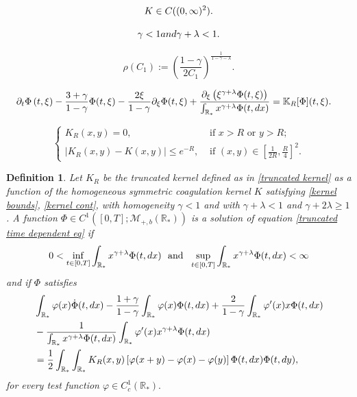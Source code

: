 \documentclass[10pt,a4paper]{amsart}
\newtheorem{definition}{Definition}
\newcommand{\der}{\textup{d}}
\begin{document}
\begin{equation}\label{kernel cont}
    K\in\textup{C}((0,\infty)^{2}).
\end{equation}

\begin{equation}\label{avoid_gelation_parameters}
    \gamma<1 \textup{ and } \gamma+\lambda<1.
\end{equation}

\begin{equation}\label{delta1formula}
\rho(C_1):= \left(\frac{1-\gamma }{2 C_1} \right)^{\frac{1}{1-\gamma -\lambda}}.
\end{equation} 

\begin{align}
\label{truncated time dependent eq}
&\partial_{t} \Phi \left( t, \xi \right)- \frac{3+\gamma}{1-\gamma}\Phi(t, \xi) - \frac{2\xi}{1-\gamma} \partial_\xi \Phi(t, \xi) + \frac{\partial_\xi \left( \xi^{\gamma+\lambda} \Phi(t, \xi)\right)  }{\int_{\mathbb R_*} x^{\gamma+\lambda} \Phi(t, \der x ) } =\mathbb K_R [\Phi](t, \xi).
\end{align}

 \begin{equation}\label{truncated kernel} 
 \begin{cases}
 K_R(x,y)=0, &\text{ if } x>R \text{ or } y > R; \\
  | K_R(x,y) - K(x,y) |\leq e^{-R}, &\text{ if } (x,y) \in \left[ \frac{1}{2 R}, \frac{R}{4}\right]^2.
 \end{cases} 
 \end{equation} 

\begin{definition}\label{def:truncated time dep} 
Let $K_R$ be the truncated kernel defined as in \eqref{truncated kernel} as a function of the homogeneous symmetric coagulation kernel $K$ satisfying
\eqref{kernel bounds}, \eqref{kernel cont},  with homogeneity $\gamma < 1 $ and with $\gamma + \lambda < 1$ and $\gamma + 2 \lambda \geq 1 $. A function $\Phi \in C^1([0,T]; \mathcal M_{+,b}(\mathbb R_*))$ is a solution of equation \eqref{truncated time dependent eq} if 
\[
0 < \inf_{  t \in [0, T]  }\int_{\mathbb R_*} x^{\gamma+\lambda } \Phi(t, \der x ) \ \text{ and } \ \sup_{  t \in [0, T]  }\int_{\mathbb R_*} x^{\gamma+\lambda } \Phi(t, \der x ) < \infty 
\] 
and if $\Phi$ satisfies 
\begin{align}\label{weak truncated time dependent eq}
& \int_{\mathbb R_*} \varphi(x) \dot{\Phi}(t, \der x)- \frac{1+\gamma}{1-\gamma} \int_{\mathbb R_*}  \varphi(x) \Phi(t, \der x) +
\frac{2}{1-\gamma} \int_{\mathbb R_*}  \varphi'(x) x \Phi(t, \der x) \\
& - \frac{1}{\int_{\mathbb R_*}x^{\gamma +\lambda}\Phi(t,\der x)}  \int_{\mathbb R_*}  \varphi'(x) x^{\gamma + \lambda}\Phi(t, \der x) \nonumber \\
& =\frac{1}{2}\int_{\mathbb R_*} \int_{\mathbb R_*} K_R(x,y) \left[ \varphi(x+y)- \varphi(x) - \varphi(y) \right] \Phi(t, \der x) \Phi(t, \der y), \nonumber 
\end{align} 
for every test function $\varphi \in C^1_c(\mathbb R_*).$
\end{definition}
\end{document}
